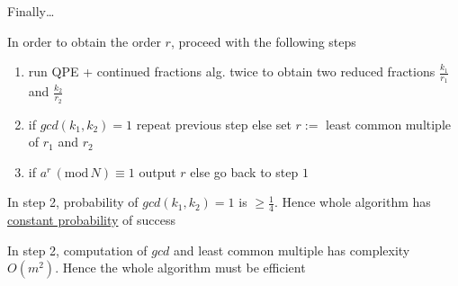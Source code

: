 \documentclass{beamer}
\begin{document}
\begin{frame}{Finally\dots}

        In order to obtain the order $r$, proceed with the following steps
        \begin{enumerate}
                \item run QPE + continued fractions alg. twice to obtain two
                        reduced fractions $\frac{k_1}{r_1}$ and
                        $\frac{k_2}{r_2}$
                \item if $gcd(k_1,k_2) = 1$ repeat previous step else set
                $r:=$ least common multiple of $r_1$ and $r_2$
                \item if $a^r \, (\mathrm{mod} \, N) \equiv 1$ 
                         output $r$ else go back to step $1$
        \end{enumerate}
       
        \pause
        In step 2, probability of $gcd(k_1,k_2) = 1$ is $\geq \frac{1}{4}$.
        Hence whole algorithm has \alert{\underline{constant probability}} of
        success
        
        In step 2, computation of $gcd$ and least common multiple has
        complexity $O(m^2)$. Hence the whole algorithm must be efficient
\end{frame}
\end{document}
